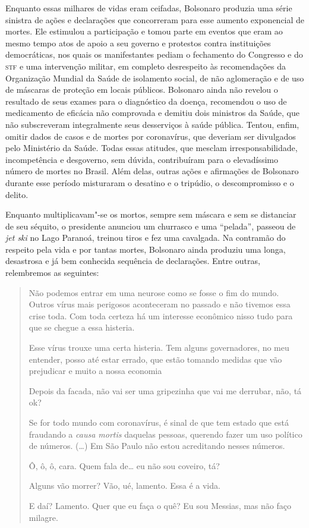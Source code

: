 Enquanto essas milhares de vidas eram ceifadas, Bolsonaro produzia uma
série sinistra de ações e declarações que concorreram para esse aumento
exponencial de mortes. Ele estimulou a participação e tomou parte em
eventos que eram ao mesmo tempo atos de apoio a seu governo e protestos
contra instituições democráticas, nos quais os manifestantes pediam o
fechamento do Congresso e do \textsc{stf} e uma intervenção militar, em completo
desrespeito às recomendações da Organização Mundial da Saúde de
isolamento social, de não aglomeração e de uso de máscaras de proteção
em locais públicos. Bolsonaro ainda não revelou o resultado de seus
exames para o diagnóstico da doença, recomendou o uso de medicamento de
eficácia não comprovada e demitiu dois ministros da Saúde, que não
subscreveram integralmente seus desserviços à saúde pública. Tentou,
enfim, omitir dados de casos e de mortes por coronavírus, que deveriam
ser divulgados pelo Ministério da Saúde. Todas essas atitudes, que
mesclam irresponsabilidade, incompetência e desgoverno, sem dúvida,
contribuíram para o elevadíssimo número de mortes no Brasil. Além delas,
outras ações e afirmações de Bolsonaro durante esse período misturaram o
desatino e o tripúdio, o descompromisso e o delito.

Enquanto multiplicavam"-se os mortos, sempre sem máscara e sem se
distanciar de seu séquito, o presidente anunciou um churrasco e uma
``pelada'', passeou de \emph{jet ski} no Lago Paranoá, treinou tiros e
fez uma cavalgada. Na contramão do respeito pela vida e por tantas
mortes, Bolsonaro ainda produziu uma longa, desastrosa e já bem
conhecida sequência de declarações. Entre outras, relembremos as
seguintes:

\begin{quote}
Não podemos entrar em uma neurose como se fosse o fim do mundo. Outros
vírus mais perigosos aconteceram no passado e não tivemos essa crise
toda. Com toda certeza há um interesse econômico nisso tudo para que se
chegue a essa histeria.

Esse vírus trouxe uma certa histeria. Tem alguns governadores, no meu
entender, posso até estar errado, que estão tomando medidas que vão
prejudicar e muito a nossa economia

Depois da facada, não vai ser uma gripezinha que vai me derrubar, não,
tá ok?

Se for todo mundo com coronavírus, é sinal de que tem estado que está
fraudando a \emph{causa mortis} daquelas pessoas, querendo fazer um uso
político de números. (\ldots{}) Em São Paulo não estou acreditando nesses
números.

Ô, ô, ô, cara. Quem fala de\ldots{} eu não sou coveiro, tá?

Alguns vão morrer? Vão, ué, lamento. Essa é a vida.

E daí? Lamento. Quer que eu faça o quê? Eu sou Messias, mas não faço
milagre.
\end{quote}

